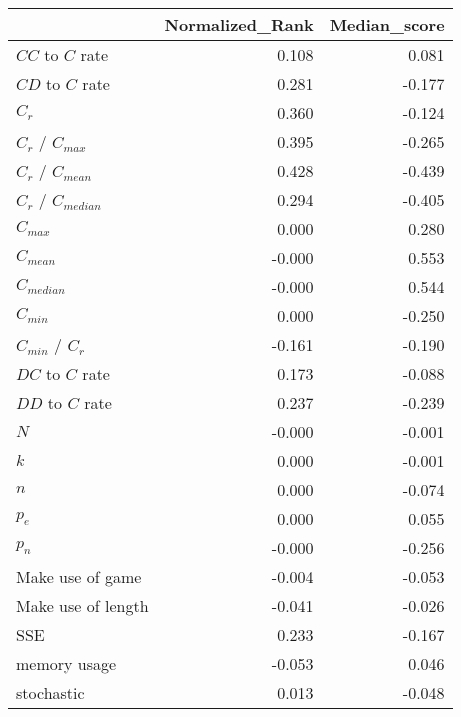 \begin{tabular}{lrr}
\toprule
{} &  Normalized_Rank &  Median_score \\
\midrule
$CC$ to $C$ rate     &            0.108 &         0.081 \\
$CD$ to $C$ rate     &            0.281 &        -0.177 \\
$C_r$                &            0.360 &        -0.124 \\
$C_r$ / $C_{max}$    &            0.395 &        -0.265 \\
$C_r$ / $C_{mean}$   &            0.428 &        -0.439 \\
$C_r$ / $C_{median}$ &            0.294 &        -0.405 \\
$C_{max}$            &            0.000 &         0.280 \\
$C_{mean}$           &           -0.000 &         0.553 \\
$C_{median}$         &           -0.000 &         0.544 \\
$C_{min}$            &            0.000 &        -0.250 \\
$C_{min}$ / $C_r$    &           -0.161 &        -0.190 \\
$DC$ to $C$ rate     &            0.173 &        -0.088 \\
$DD$ to $C$ rate     &            0.237 &        -0.239 \\
$N$                  &           -0.000 &        -0.001 \\
$k$                  &            0.000 &        -0.001 \\
$n$                  &            0.000 &        -0.074 \\
$p_e$                &            0.000 &         0.055 \\
$p_n$                &           -0.000 &        -0.256 \\
Make use of game     &           -0.004 &        -0.053 \\
Make use of length   &           -0.041 &        -0.026 \\
SSE                  &            0.233 &        -0.167 \\
memory usage         &           -0.053 &         0.046 \\
stochastic           &            0.013 &        -0.048 \\
\bottomrule
\end{tabular}
